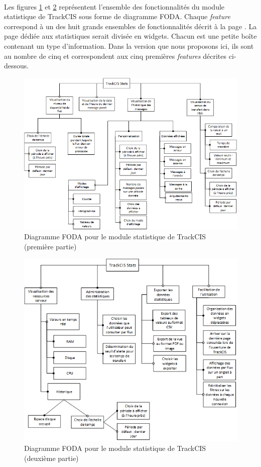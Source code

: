 			\paragraph{}
			Les figures \ref{foda_1} et \ref{foda_2} représentent l'ensemble des
			fonctionnalités du module statistique de TrackCIS sous forme de diagramme FODA.
			Chaque \textit{feature} correspond à un des huit grands ensembles de
			fonctionnalités décrit à la page \pageref{ensembles_fonctios}.\newline
			La page dédiée aux statistiques serait divisée en widgets. Chacun est une
			petite boîte contenant un type d'information. Dans la version que nous
			proposons ici, ils sont au nombre de cinq et correspondent aux cinq premières
			\textit{features} décrites ci-dessous.
			\begin{figure}[H]%
				\centering
				\includegraphics[width=16cm]{../img/part2/foda_1.png}
				\caption{\label{foda_1} Diagramme FODA pour le module statistique de
				TrackCIS (première partie)}
			\end{figure}
			\begin{figure}[H]%
				\centering
				\includegraphics[width=16cm]{../img/part2/foda_2.png}
				\caption{\label{foda_2} Diagramme FODA pour le module statistique de
				TrackCIS (deuxième partie)}
			\end{figure}
			
